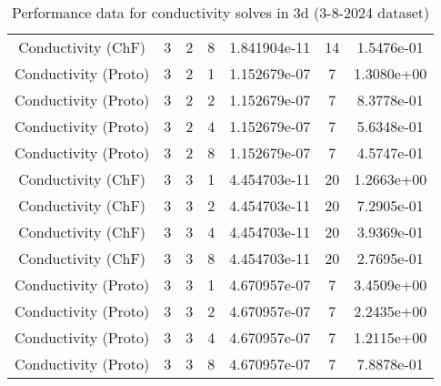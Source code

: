 \documentclass{article}
\begin{document}
\begin{small}
\begin{table}
\begin{center}
\begin{tabular}{|c|c|c|c|c|c||c|}
        Conductivity    (ChF) & 3 & 2 & 8& 1.841904e-11 & 14 & 1.5476e-01\\
        Conductivity  (Proto) & 3 & 2 & 1& 1.152679e-07 & 7 & 1.3080e+00\\
        Conductivity  (Proto) & 3 & 2 & 2& 1.152679e-07 & 7 & 8.3778e-01\\
        Conductivity  (Proto) & 3 & 2 & 4& 1.152679e-07 & 7 & 5.6348e-01\\
        Conductivity  (Proto) & 3 & 2 & 8& 1.152679e-07 & 7 & 4.5747e-01\\
        \hline 
        Conductivity    (ChF) & 3 & 3 & 1& 4.454703e-11 & 20 & 1.2663e+00\\
        Conductivity    (ChF) & 3 & 3 & 2& 4.454703e-11 & 20 & 7.2905e-01\\
        Conductivity    (ChF) & 3 & 3 & 4& 4.454703e-11 & 20 & 3.9369e-01\\
        Conductivity    (ChF) & 3 & 3 & 8& 4.454703e-11 & 20 & 2.7695e-01\\
        Conductivity  (Proto) & 3 & 3 & 1& 4.670957e-07 & 7 & 3.4509e+00\\
        Conductivity  (Proto) & 3 & 3 & 2& 4.670957e-07 & 7 & 2.2435e+00\\
        Conductivity  (Proto) & 3 & 3 & 4& 4.670957e-07 & 7 & 1.2115e+00\\
        Conductivity  (Proto) & 3 & 3 & 8& 4.670957e-07 & 7 & 7.8878e-01\\
        \hline 
      \end{tabular} 
    \end{center}   
    \label{tab::datareductiontable3102024.cond_3} 
    \caption{Performance data for  conductivity solves in 3d (3-8-2024 dataset)}
  \end{table} 
\end{small}
\end{document}
